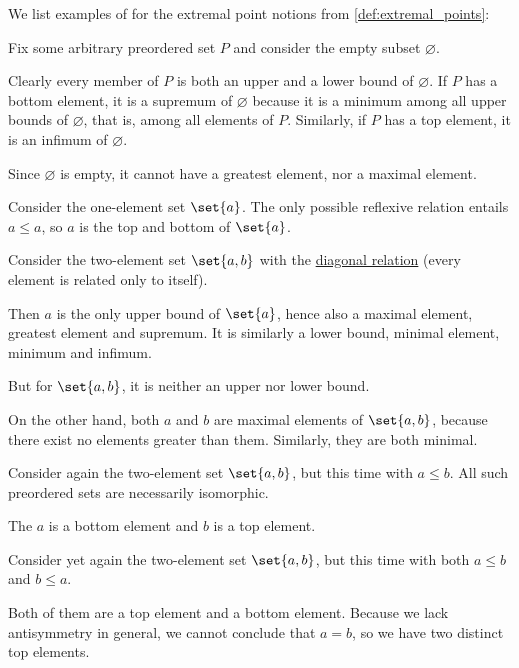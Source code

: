 \begin{example}\label{ex:thm:def:extremal_points}
  We list examples of for the extremal point notions from \cref{def:extremal_points}:
  \begin{thmenum}
     Fix some arbitrary preordered set \( P \) and consider the empty subset \( \varnothing \).

    Clearly every member of \( P \) is both an upper and a lower bound of \( \varnothing \). If \( P \) has a bottom element, it is a supremum of \( \varnothing \) because it is a minimum among all upper bounds of \( \varnothing \), that is, among all elements of \( P \). Similarly, if \( P \) has a top element, it is an infimum of \( \varnothing \).

    Since \( \varnothing \) is empty, it cannot have a greatest element, nor a maximal element.

     Consider the one-element set \( \set{ a } \). The only possible reflexive relation entails \( a \leq a \), so \( a \) is the top and bottom of \( \set{ a } \).

     Consider the two-element set \( \set{ a, b } \) with the \hyperref[def:binary_relation/diagonal]{diagonal relation} (every element is related only to itself).

    Then \( a \) is the only upper bound of \( \set{ a } \), hence also a maximal element, greatest element and supremum. It is similarly a lower bound, minimal element, minimum and infimum.

    But for \( \set{ a, b } \), it is neither an upper nor lower bound.

    On the other hand, both \( a \) and \( b \) are maximal elements of \( \set{ a, b } \), because there exist no elements greater than them. Similarly, they are both minimal.

     Consider again the two-element set \( \set{ a, b } \), but this time with \( a \leq b \). All such preordered sets are necessarily isomorphic.

    The \( a \) is a bottom element and \( b \) is a top element.

     Consider yet again the two-element set \( \set{ a, b } \), but this time with both \( a \leq b \) and \( b \leq a \).

    Both of them are a top element and a bottom element. Because we lack antisymmetry in general, we cannot conclude that \( a = b \), so we have two distinct top elements.


\end{thmenum}
\end{example}
